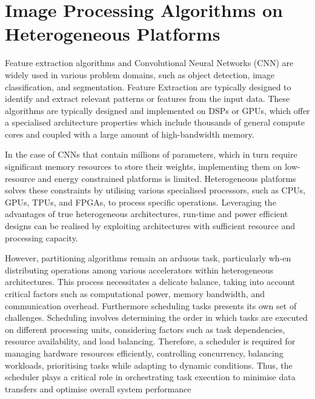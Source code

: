 \chapter{Image Processing Algorithms on Heterogeneous Platforms }
\label{sec:HCNN}

Feature extraction algorithms and Convolutional Neural Networks (CNN) are widely used in various problem domains, such as object detection, image classification, and segmentation. Feature Extraction  are typically designed to identify and extract relevant patterns or features from the input data. These algorithms are typically designed and implemented on DSPs or GPUs, which offer a specialised architecture properties which include thousands of general compute cores and coupled with a large amount of high-bandwidth memory. 

In the case of CNNs that contain millions of parameters, which in turn require significant memory resources to store their weights, implementing them on low-resource and energy constrained platforms is limited. Heterogeneous platforms solves these constraints by  utilising various specialised processors, such as CPUs, GPUs, TPUs, and FPGAs, to process specific operations. Leveraging the advantages of true heterogeneous architectures, run-time and power efficient designs can be realised by exploiting architectures with sufficient resource and processing capacity. 

However, partitioning algorithms remain an arduous task, particularly wh-en distributing operations among various accelerators within heterogeneous architectures. This process necessitates a delicate balance, taking into account critical factors such as computational power, memory bandwidth, and communication overhead. Furthermore scheduling tasks presents its own set of challenges. Scheduling involves determining the order in which tasks are executed on different processing units, considering factors such as task dependencies, resource availability, and load balancing. Therefore, a scheduler is required for managing hardware resources efficiently, controlling concurrency, balancing workloads, prioritising tasks while adapting to dynamic conditions. Thus, the scheduler plays a critical role in orchestrating task execution to minimise data transfers and optimise overall system performance


